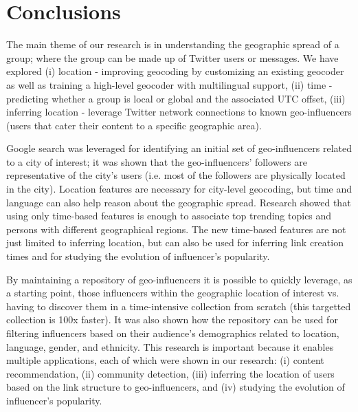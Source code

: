 \chapter{Conclusions}\label{chap:Conclusion}

The main theme of our research is in understanding the geographic spread of a group; where the group can be made up of Twitter users or messages. We have explored (i) location - improving geocoding by customizing an existing geocoder as well as training a high-level geocoder with multilingual support, (ii) time - predicting whether a group is local or global and the associated UTC offset, (iii) inferring location - leverage Twitter network connections to known geo-influencers (users that cater their content to a specific geographic area). 

Google search was leveraged for identifying an initial set of geo-influencers related to a city of interest; it was shown that the geo-influencers' followers are representative of the city's users (i.e. most of the followers are physically located in the city). Location features are necessary for city-level geocoding, but time and language can also help reason about the geographic spread. Research showed that using only time-based features is enough to associate top trending topics and persons with different geographical regions. The new time-based features are not just limited to inferring location, but can also be used for inferring link creation times and for studying the evolution of influencer's popularity.

By maintaining a repository of geo-influencers it is possible to quickly leverage, as a starting point, those influencers within the geographic location of interest vs. having to discover them in a time-intensive collection from scratch (this targetted collection is 100x faster). It was also shown how the repository can be used for filtering influencers based on their audience's demographics related to location, language, gender, and ethnicity.  
This research is important because it enables multiple applications, each of which were shown in our research: (i) content recommendation, (ii) community detection, (iii) inferring the location of users based on the link structure to geo-influencers, and (iv) studying the evolution of influencer's popularity. %


